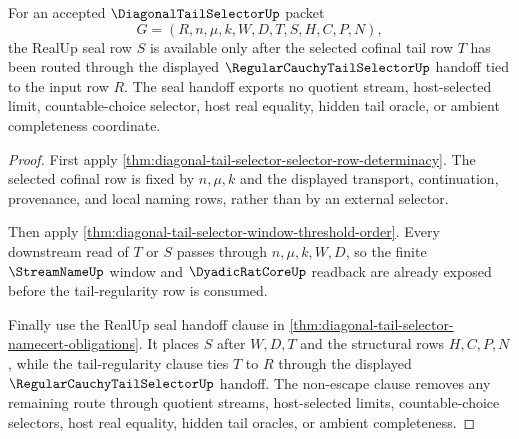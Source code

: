 \begin{theorem}
\label{thm:diagonal-tail-selector-seal-after-tail-regularity}
For an accepted $\DiagonalTailSelectorUp$ packet
$$
G=(R,n,\mu,k,W,D,T,S,H,C,P,N),
$$
the RealUp seal row $S$ is available only after the selected cofinal tail row
$T$ has been routed through the displayed
$\RegularCauchyTailSelectorUp$ handoff tied to the input row $R$. The seal
handoff exports no quotient stream, host-selected limit, countable-choice
selector, host real equality, hidden tail oracle, or ambient completeness
coordinate.
\end{theorem}
\begin{proof}
First apply
\autoref{thm:diagonal-tail-selector-selector-row-determinacy}. The selected
cofinal row is fixed by $n,\mu,k$ and the displayed transport, continuation,
provenance, and local naming rows, rather than by an external selector.

Then apply
\autoref{thm:diagonal-tail-selector-window-threshold-order}. Every downstream
read of $T$ or $S$ passes through $n,\mu,k,W,D$, so the finite
$\StreamNameUp$ window and $\DyadicRatCoreUp$ readback are already exposed
before the tail-regularity row is consumed.

Finally use the RealUp seal handoff clause in
\autoref{thm:diagonal-tail-selector-namecert-obligations}. It places $S$
after $W,D,T$ and the structural rows $H,C,P,N$, while the tail-regularity
clause ties $T$ to $R$ through the displayed
$\RegularCauchyTailSelectorUp$ handoff. The non-escape clause removes any
remaining route through quotient streams, host-selected limits,
countable-choice selectors, host real equality, hidden tail oracles, or
ambient completeness.
\end{proof}

